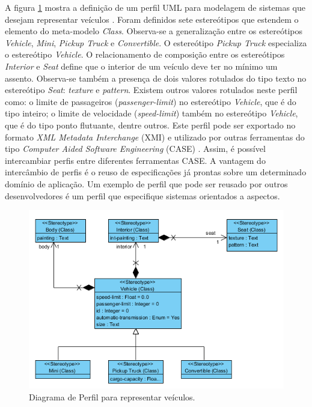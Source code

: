 A figura \ref{fig:profile_diagram} mostra a definição de um perfil UML para modelagem de sistemas que desejam representar veículos
\cite{VisualParadigm11}. Foram definidos sete estereótipos que estendem o elemento do meta-modelo \textit{Class}. Observa-se a generalização entre os
estereótipos \textit{Vehicle}, \textit{Mini}, \textit{Pickup Truck} e \textit{Convertible}. O estereótipo \textit{Pickup Truck} especializa o
estereótipo \textit{Vehicle}. O relacionamento de composição entre os estereótipos \textit{Interior} e \textit{Seat} define que o interior de um
veículo deve ter no mínimo um assento. Observa-se também a presença de dois valores rotulados do tipo texto no estereótipo \textit{Seat}:
\textit{texture} e \textit{pattern}. Existem outros valores rotulados neste perfil como: o limite de passageiros (\textit{passenger-limit}) no
estereótipo \textit{Vehicle}, que é do tipo inteiro; o limite de velocidade (\textit{speed-limit}) também no estereótipo \textit{Vehicle}, que é do
tipo ponto flutuante, dentre outros. Este perfil pode ser exportado no formato \textit{XML Metadata Interchange} (XMI)  \cite{xmi:11} 
e utilizado por outras ferramentas do tipo \textit{Computer Aided Software Engineering} (CASE) . Assim, 
é possível intercambiar perfis entre diferentes ferramentas CASE. A vantagem do intercâmbio de perfis é o reuso de
especificações já prontas sobre um determinado domínio de aplicação. Um exemplo de perfil que pode ser reusado por outros desenvolvedores é um perfil
que especifique sistemas orientados a aspectos.

\begin{figure}
	\centering
	\includegraphics{img/profile_diagram.png}
	\caption{Diagrama de Perfil para representar
	veículos.}\label{fig:profile_diagram}
\end{figure}

